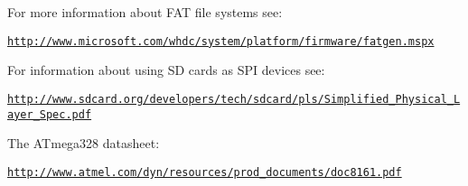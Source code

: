 For more information about F\+AT file systems see\+:

\href{http://www.microsoft.com/whdc/system/platform/firmware/fatgen.mspx}{\tt http\+://www.\+microsoft.\+com/whdc/system/platform/firmware/fatgen.\+mspx}

For information about using SD cards as S\+PI devices see\+:

\href{http://www.sdcard.org/developers/tech/sdcard/pls/Simplified_Physical_Layer_Spec.pdf}{\tt http\+://www.\+sdcard.\+org/developers/tech/sdcard/pls/\+Simplified\+\_\+\+Physical\+\_\+\+Layer\+\_\+\+Spec.\+pdf}

The A\+Tmega328 datasheet\+:

\href{http://www.atmel.com/dyn/resources/prod_documents/doc8161.pdf}{\tt http\+://www.\+atmel.\+com/dyn/resources/prod\+\_\+documents/doc8161.\+pdf} 